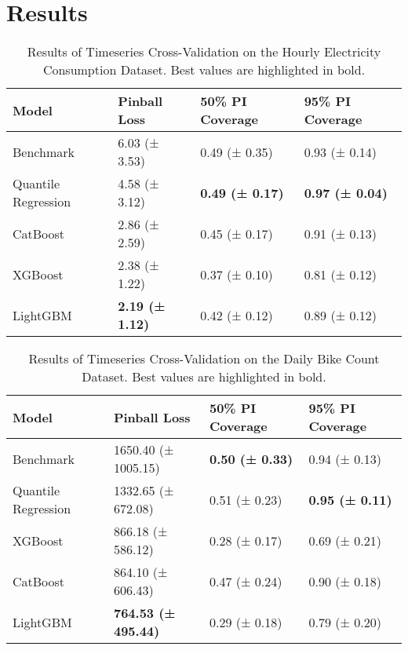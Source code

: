 \newpage
\section{Results}
\label{ch:Results}

\begin{table}[htp]
\centering
\begin{tabular}{llll}
\toprule
Model & Pinball Loss & 50\% PI Coverage & 95\% PI Coverage \\
\midrule
Benchmark & 6.03 (± 3.53) & 0.49 (± 0.35) & 0.93 (± 0.14) \\
Quantile Regression & 4.58 (± 3.12) & \textbf{0.49 (± 0.17)} & \textbf{0.97 (± 0.04)} \\
CatBoost & 2.86 (± 2.59) & 0.45 (± 0.17) & 0.91 (± 0.13) \\
XGBoost & 2.38 (± 1.22) & 0.37 (± 0.10) & 0.81 (± 0.12) \\
LightGBM & \textbf{2.19 (± 1.12)} & 0.42 (± 0.12) & 0.89 (± 0.12) \\
\bottomrule
\end{tabular}
\caption{Results of Timeseries Cross-Validation on the Hourly Electricity Consumption Dataset. Best values are highlighted in bold.}
\label{tab:energy_results}
\end{table}

\begin{table}[htp]
\centering
\begin{tabular}{llll}
\toprule
Model & Pinball Loss & 50\% PI Coverage & 95\% PI Coverage \\
\midrule
Benchmark & 1650.40 (± 1005.15) & \textbf{0.50 (± 0.33)} & 0.94 (± 0.13) \\
Quantile Regression & 1332.65 (± 672.08) & 0.51 (± 0.23) & \textbf{0.95 (± 0.11)} \\
XGBoost & 866.18 (± 586.12) & 0.28 (± 0.17) & 0.69 (± 0.21) \\
CatBoost & 864.10 (± 606.43) & 0.47 (± 0.24) & 0.90 (± 0.18) \\
LightGBM & \textbf{764.53 (± 495.44)} & 0.29 (± 0.18) & 0.79 (± 0.20) \\
\bottomrule
\end{tabular}
\caption{Results of Timeseries Cross-Validation on the Daily Bike Count Dataset. Best values are highlighted in bold.}
\label{tab:bikes_results}
\end{table}